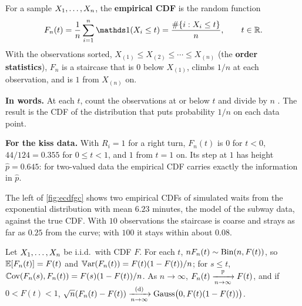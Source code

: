 \begin{definition}
\label{def:ecdf}
For a sample $X_1, \ldots, X_n$, the \textbf{empirical CDF} is the random function
\[
F_n(t) = \frac1n\sum_{i=1}^n \ind(X_i \leq t) = \frac{\#\{i : X_i \leq t\}}{n}, \qquad t \in \real.
\]
With the observations sorted, $X_{(1)} \leq X_{(2)} \leq \cdots \leq X_{(n)}$ (the \textbf{order statistics}), $F_n$ is a staircase that is $0$ below $X_{(1)}$, climbs $1/n$ at each observation, and is $1$ from $X_{(n)}$ on.
\end{definition}

\begin{inwords}
\textbf{In words.} At each $t$, count the observations at or below $t$ and divide by $n$ . The result is the CDF of the distribution that puts probability $1/n$ on each data point.
\par\smallskip
\textbf{For the kiss data.} With $R_i = 1$ for a right turn, $F_n(t)$ is $0$ for $t < 0$, $44/124 = 0.355$ for $0 \leq t < 1$, and $1$ from $t = 1$ on. Its step at $1$ has height $\hat{p} = 0.645$: for two-valued data the empirical CDF carries exactly the information in $\hat{p}$.
\end{inwords}

The left of \cref{fig:ecdfgc} shows two empirical CDFs of simulated waits from the exponential distribution with mean $6.23$ minutes, the model of the subway data, against the true CDF.
With $10$ observations the staircase is coarse and strays as far as $0.25$ from the curve; with $100$ it stays within about $0.08$.


\begin{proposition}
\label{prop:ecdf-pointwise}
Let $X_1, \ldots, X_n$ be i.i.d.\ with CDF $F$. For each $t$, $nF_n(t) \sim \mathrm{Bin}(n, F(t))$, so $\operatorname*{\mathbb{E}}[F_n(t)] = F(t)$ and $\operatorname*{\mathbb{V}\text{ar}}(F_n(t)) = F(t)(1 - F(t))/n$; for $s \leq t$, $\operatorname*{\mathbb{C}\text{ov}}(F_n(s), F_n(t)) = F(s)(1 - F(t))/n$. As $n \to \infty$, $F_n(t) \xrightarrow [n \to \infty ]{\mathbb{P}} F(t)$, and if $0 < F(t) < 1$, $\sqrt{n}(F_n(t) - F(t)) \xrightarrow [n \to \infty ]{\text{(d)}} \text{Gauss}\big(0, F(t)(1 - F(t))\big)$.
\end{proposition}

